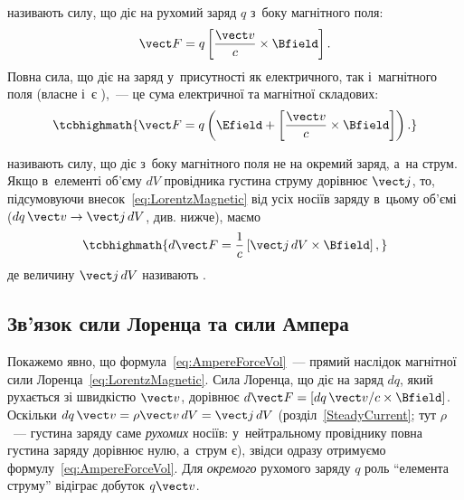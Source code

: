  називають силу, що діє на рухомий заряд $q$
з~боку магнітного поля:
\begin{equation}\label{eq:LorentzMagnetic}
	\vect F = q\left[\frac{\vect v}{c}\times\Bfield\right].
\end{equation}
Повна сила, що діє на заряд у~присутності як електричного, так і~магнітного поля (власне
і~є ),~--- це сума електричної та магнітної складових:
\begin{equation*}
	\tcbhighmath{
		\vect F = q\left(\Efield + \left[\frac{\vect v}{c}\times\Bfield\right]\right).
	}
\end{equation*}

 називають силу, що діє з~боку магнітного поля не на окремий заряд,
а~на струм. Якщо в~елементі об'єму $dV$ провідника густина струму дорівнює $\vect j$, то,
підсумовуючи внесок~\eqref{eq:LorentzMagnetic} від усіх носіїв заряду в~цьому об'ємі
($dq\,\vect v \to \vect j\, dV$, див. нижче), маємо
\begin{equation}\label{eq:AmpereForceVol}
	\tcbhighmath{
		d\vect F = \frac1c\left[\vect j\, dV\times\Bfield\right],
	}
\end{equation}
де величину $\vect j\, dV$ називають .


\subsection*{Зв'язок сили Лоренца та сили Ампера}


Покажемо явно, що формула~\eqref{eq:AmpereForceVol}~--- прямий наслідок магнітної сили
Лоренца~\eqref{eq:LorentzMagnetic}. Сила Лоренца, що діє на заряд $dq$, який рухається зі
швидкістю $\vect v$, дорівнює $d\vect F = \left[dq\,\vect v/c \times\Bfield\right]$.
Оскільки $dq\,\vect v = \rho\vect v\, dV = \vect j\, dV$ (розділ~\ref{SteadyCurrent}; тут
$\rho$~--- густина заряду саме \emph{рухомих} носіїв: у~нейтральному провіднику повна
густина заряду дорівнює нулю, а~струм є), звідси одразу отримуємо
формулу~\eqref{eq:AmpereForceVol}. Для \emph{окремого} рухомого заряду $q$ роль
\enquote{елемента струму} відіграє добуток $q\vect v$.


